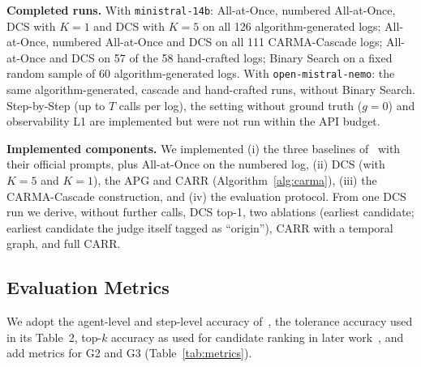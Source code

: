 \documentclass[conference]{IEEEtran}
\begin{document}
\textbf{Completed runs.} With \texttt{ministral-14b}: All-at-Once, numbered All-at-Once, DCS with $K{=}1$ and DCS with $K{=}5$ on all 126 algorithm-generated logs; All-at-Once, numbered All-at-Once and DCS on all 111 CARMA-Cascade logs; All-at-Once and DCS on 57 of the 58 hand-crafted logs; Binary Search on a fixed random sample of 60 algorithm-generated logs. With \texttt{open-mistral-nemo}: the same algorithm-generated, cascade and hand-crafted runs, without Binary Search. Step-by-Step (up to $T$ calls per log), the setting without ground truth ($g=0$) and observability L1 are implemented but were not run within the API budget.

\textbf{Implemented components.} We implemented (i) the three baselines of~\cite{zhang2025whowhen} with their official prompts, plus All-at-Once on the numbered log, (ii) DCS (with $K=5$ and $K=1$), the APG and CARR (Algorithm~\ref{alg:carma}), (iii) the CARMA-Cascade construction, and (iv) the evaluation protocol. From one DCS run we derive, without further calls, DCS top-1, two ablations (earliest candidate; earliest candidate the judge itself tagged as ``origin''), CARR with a temporal graph, and full CARR.

\subsection{Evaluation Metrics}
We adopt the agent-level and step-level accuracy of~\cite{zhang2025whowhen}, the tolerance accuracy used in its Table~2, top-$k$ accuracy as used for candidate ranking in later work~\cite{feng2026conformal}, and add metrics for G2 and G3 (Table~\ref{tab:metrics}).
\end{document}
